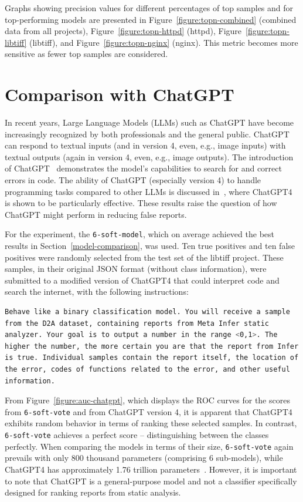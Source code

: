 Graphs showing precision values for different percentages of top samples and for top-performing models are presented in Figure~\ref{figure:topn-combined} (combined data from all projects), Figure~\ref{figure:topn-httpd} (httpd), Figure~\ref{figure:topn-libtiff} (libtiff), and Figure~\ref{figure:topn-nginx} (nginx). This metric becomes more sensitive as fewer top samples are considered.


\section{Comparison with ChatGPT}
\label{comparison-chatgpt}
In recent years, Large Language Models (LLMs) such as ChatGPT have become increasingly recognized by both professionals and the general public. ChatGPT can respond to textual inputs (and in version 4, even, e.g., image inputs) with textual outputs (again in version 4, even, e.g.,  image outputs). The introduction of ChatGPT~\cite{chatgpt} demonstrates the model's capabilities to search for and correct errors in code. The ability of ChatGPT (especially version 4) to handle programming tasks compared to other LLMs is discussed in~\cite{coello2024effectiveness}, where ChatGPT4 is shown to be particularly effective. These results raise the question of how ChatGPT might perform in reducing false reports.

For the experiment, the \texttt{6-soft-model}, which on average achieved the best results in Section~\ref{model-comparison}, was used. Ten true positives and ten false positives were randomly selected from the test set of the libtiff project. These samples, in their original JSON format (without class information), were submitted to a modified version of ChatGPT4 that could interpret code and search the internet, with the following instructions:
\begin{lstlisting}[language=bash, xleftmargin=2em]
Behave like a binary classification model. You will receive a sample 
from the D2A dataset, containing reports from Meta Infer static 
analyzer. Your goal is to output a number in the range <0,1>. The 
higher the number, the more certain you are that the report from Infer
is true. Individual samples contain the report itself, the location of 
the error, codes of functions related to the error, and other useful 
information.
\end{lstlisting}

From Figure~\ref{figure:auc-chatgpt}, which displays the ROC curves for the scores from \texttt{6-soft-vote} and from ChatGPT version 4, it is apparent that ChatGPT4 exhibits random behavior in terms of ranking these selected samples. In contrast, \texttt{6-soft-vote} achieves a perfect score -- distinguishing between the classes perfectly. When comparing the models in terms of their size, \texttt{6-soft-vote} again prevails with only 800 thousand parameters (comprising 6 sub-models), while ChatGPT4 has approximately 1.76 trillion parameters~\cite{chatgpt-params}. However, it is important to note that ChatGPT is a general-purpose model and not a classifier specifically designed for ranking reports from static analysis.

